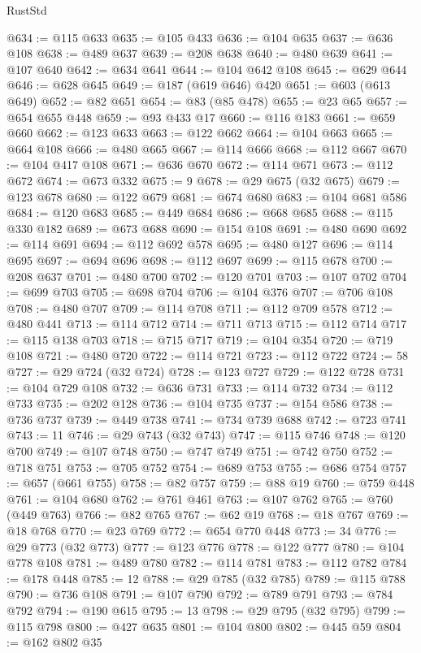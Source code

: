 \begin{lexlean}{RustStd}
\begin{coremodule}
@634 := @115 @633
@635 := @105 @433
@636 := @104 @635
@637 := @636 @108
@638 := @489 @637
@639 := @208 @638
@640 := @480 @639
@641 := @107 @640
@642 := @634 @641
@644 := @104 @642 @108
@645 := @629 @644
@646 := @628 @645
@649 := @187 (@619 @646) @420
@651 := @603 (@613 @649)
@652 := @82 @651
@654 := @83 (@85 @478)
@655 := @23 @65
@657 := @654 @655 @448
@659 := @93 @433 @17
@660 := @116 @183
@661 := @659 @660
@662 := @123 @633
@663 := @122 @662
@664 := @104 @663
@665 := @664 @108
@666 := @480 @665
@667 := @114 @666
@668 := @112 @667
@670 := @104 @417 @108
@671 := @636 @670
@672 := @114 @671
@673 := @112 @672
@674 := @673 @332
@675 := 9
@678 := @29 @675 (@32 @675)
@679 := @123 @678
@680 := @122 @679
@681 := @674 @680
@683 := @104 @681 @586
@684 := @120 @683
@685 := @449 @684
@686 := @668 @685
@688 := @115 @330 @182
@689 := @673 @688
@690 := @154 @108
@691 := @480 @690
@692 := @114 @691
@694 := @112 @692 @578
@695 := @480 @127
@696 := @114 @695
@697 := @694 @696
@698 := @112 @697
@699 := @115 @678
@700 := @208 @637
@701 := @480 @700
@702 := @120 @701
@703 := @107 @702
@704 := @699 @703
@705 := @698 @704
@706 := @104 @376
@707 := @706 @108
@708 := @480 @707
@709 := @114 @708
@711 := @112 @709 @578
@712 := @480 @441
@713 := @114 @712
@714 := @711 @713
@715 := @112 @714
@717 := @115 @138 @703
@718 := @715 @717
@719 := @104 @354
@720 := @719 @108
@721 := @480 @720
@722 := @114 @721
@723 := @112 @722
@724 := 58
@727 := @29 @724 (@32 @724)
@728 := @123 @727
@729 := @122 @728
@731 := @104 @729 @108
@732 := @636 @731
@733 := @114 @732
@734 := @112 @733
@735 := @202 @128
@736 := @104 @735
@737 := @154 @586
@738 := @736 @737
@739 := @449 @738
@741 := @734 @739 @688
@742 := @723 @741
@743 := 11
@746 := @29 @743 (@32 @743)
@747 := @115 @746
@748 := @120 @700
@749 := @107 @748
@750 := @747 @749
@751 := @742 @750
@752 := @718 @751
@753 := @705 @752
@754 := @689 @753
@755 := @686 @754
@757 := @657 (@661 @755)
@758 := @82 @757
@759 := @88 @19
@760 := @759 @448
@761 := @104 @680
@762 := @761 @461
@763 := @107 @762
@765 := @760 (@449 @763)
@766 := @82 @765
@767 := @62 @19
@768 := @18 @767
@769 := @18 @768
@770 := @23 @769
@772 := @654 @770 @448
@773 := 34
@776 := @29 @773 (@32 @773)
@777 := @123 @776
@778 := @122 @777
@780 := @104 @778 @108
@781 := @489 @780
@782 := @114 @781
@783 := @112 @782
@784 := @178 @448
@785 := 12
@788 := @29 @785 (@32 @785)
@789 := @115 @788
@790 := @736 @108
@791 := @107 @790
@792 := @789 @791
@793 := @784 @792
@794 := @190 @615
@795 := 13
@798 := @29 @795 (@32 @795)
@799 := @115 @798
@800 := @427 @635
@801 := @104 @800
@802 := @445 @59
@804 := @162 @802 @35

\end{coremodule}
\end{lexlean}
